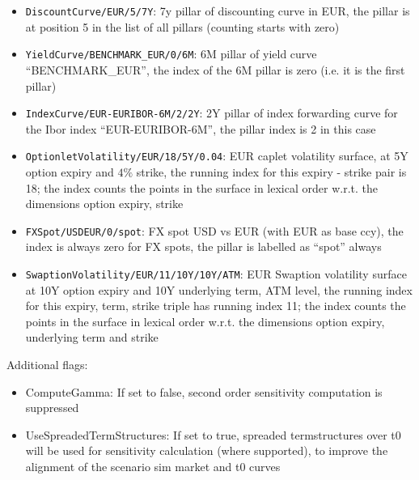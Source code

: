 \documentclass[12pt, a4paper]{article}
\begin{document}
{\begin{itemize}
\item {\tt DiscountCurve/EUR/5/7Y}: 7y pillar of discounting curve in EUR, the pillar is at position 5 in the list of
  all pillars (counting starts with zero)
\item {\tt YieldCurve/BENCHMARK\_EUR/0/6M}: 6M pillar of yield curve ``BENCHMARK\_EUR'', the index of the 6M pillar is
  zero (i.e. it is the first pillar)
\item {\tt IndexCurve/EUR-EURIBOR-6M/2/2Y}: 2Y pillar of index forwarding curve for the Ibor index ``EUR-EURIBOR-6M'',
  the pillar index is 2 in this case
\item {\tt OptionletVolatility/EUR/18/5Y/0.04}: EUR caplet volatility surface, at 5Y option expiry and $4\%$ strike, the
  running index for this expiry - strike pair is 18; the index counts the points in the surface in lexical order
  w.r.t. the dimensions option expiry, strike
\item {\tt FXSpot/USDEUR/0/spot}: FX spot USD vs EUR (with EUR as base ccy), the index is always zero for FX spots, the
  pillar is labelled as ``spot'' always
\item {\tt SwaptionVolatility/EUR/11/10Y/10Y/ATM}: EUR Swaption volatility surface at 10Y option expiry and 10Y
  underlying term, ATM level, the running index for this expiry, term, strike triple has running index 11; the index
  counts the points in the surface in lexical order w.r.t. the dimensions option expiry, underlying term and strike
\end{itemize}

Additional flags:

\begin{itemize}
\item ComputeGamma: If set to false, second order sensitivity computation is suppressed
\item UseSpreadedTermStructures: If set to true, spreaded termstructures over t0 will be used for sensitivity
  calculation (where supported), to improve the alignment of the scenario sim market and t0 curves
\end{itemize}

}
\end{document}
